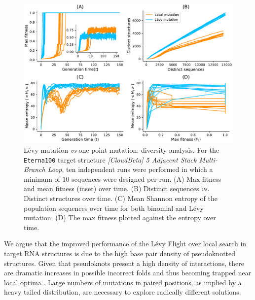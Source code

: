 \begin{figure}[t!]
	\centering
	\includegraphics[width=1.0\linewidth]{../res/images/arnaque/fig8.pdf}
	\small 
	\caption{Lévy mutation \emph{vs} one-point mutation: diversity analysis. For the \texttt{Eterna100} target structure \textit{[CloudBeta] 5 Adjacent Stack Multi-Branch Loop}, ten independent runs were performed in which a minimum of $10$ sequences were designed per run.  (A) Max fitness and mean fitness (inset) over time. (B) Distinct sequences \emph{vs.} Distinct structures over time. (C) Mean Shannon entropy of the population sequences over time for both binomial and Lévy mutation. (D) The max fitness plotted against the entropy over time.}
	\label{Fig:diversity}
	
\end{figure}

We argue that the improved performance of the Lévy Flight over local search in target RNA structures is due to the high base pair density of pseudoknotted structures. Given that pseudoknots present a high density of interactions, there are dramatic increases in possible incorrect folds and thus becoming trapped near local optima \cite{hajdin2013accurate}. Large numbers of mutations in paired positions, as implied by a heavy tailed distribution, are necessary to explore radically different solutions. 

